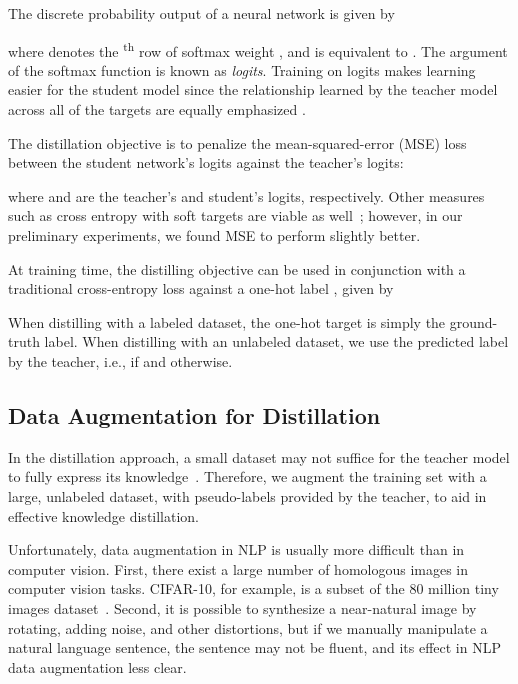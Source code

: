 \documentclass[11pt,a4paper]{article}
\begin{document}
The discrete probability output of a neural network is given by

where  denotes the \textsuperscript{th} row of softmax weight , and  is equivalent to .
The argument of the softmax function is known as \textit{logits}. Training on logits makes learning easier for the student model since the relationship learned by the teacher model across all of the targets are equally emphasized \cite{ba2014deep}.





The distillation objective is to penalize the mean-squared-error (MSE) loss between the student network's logits against the teacher's logits:

where  and  are the teacher's and student's logits, respectively. Other measures such as cross entropy with soft targets are viable as well~\cite{hinton2015distilling}; however, in our preliminary experiments, we found MSE to perform slightly better. 

At training time, the distilling objective can be used in conjunction with a traditional cross-entropy loss against a one-hot label , given by

When distilling with a labeled dataset, the one-hot target  is simply the ground-truth label. When distilling with an unlabeled dataset,  we use the predicted label by the teacher, i.e.,  if  and  otherwise.



\subsection{Data Augmentation for Distillation}
In the distillation approach, a small dataset may not suffice for the teacher model to fully express its knowledge~\cite{ba2014deep}. Therefore, we augment the training set with a large, unlabeled dataset, with pseudo-labels provided by the teacher, to aid in effective knowledge distillation.

Unfortunately, data augmentation in NLP is usually more difficult than in computer vision. First, there exist a large number of homologous images in computer vision tasks. CIFAR-10, for example, is a subset of the 80 million tiny images dataset~\cite{krizhevsky2009learning}. 
Second, it is possible to synthesize a near-natural image by rotating, adding noise, and other distortions, but if we manually manipulate a natural language sentence, the sentence may not be fluent, and its effect in NLP data augmentation less clear.
\end{document}
